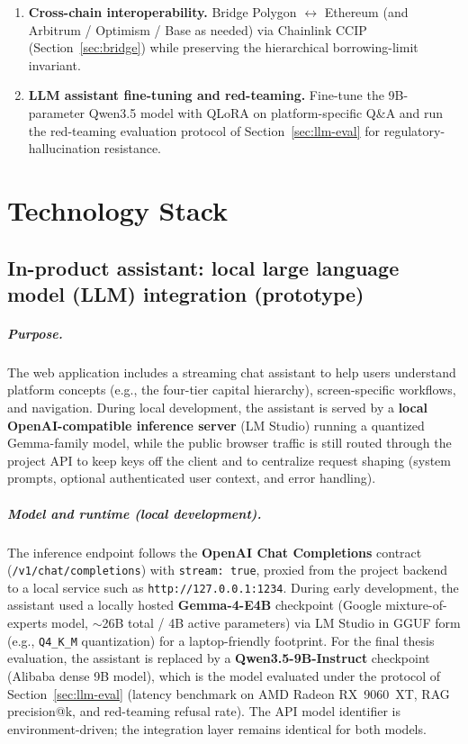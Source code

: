 \documentclass[12pt,a4paper]{report}
\begin{document}
\begin{enumerate}[noitemsep]
\item \textbf{Cross-chain interoperability.} Bridge Polygon $\leftrightarrow$ Ethereum (and Arbitrum / Optimism / Base as needed) via Chainlink CCIP (Section~\ref{sec:bridge}) while preserving the hierarchical borrowing-limit invariant.
\item \textbf{LLM assistant fine-tuning and red-teaming.} Fine-tune the 9B-parameter Qwen3.5 model with QLoRA on platform-specific Q\&A and run the red-teaming evaluation protocol of Section~\ref{sec:llm-eval} for regulatory-hallucination resistance.
\end{enumerate}


\appendix

\chapter{Technology Stack}

\section{In-product assistant: local large language model (LLM) integration (prototype)}

\paragraph{Purpose.}
The web application includes a streaming chat assistant to help users understand platform concepts (e.g., the four-tier capital hierarchy), screen-specific workflows, and navigation. During local development, the assistant is served by a \textbf{local OpenAI-compatible inference server} (LM Studio) running a quantized Gemma-family model, while the public browser traffic is still routed through the project API to keep keys off the client and to centralize request shaping (system prompts, optional authenticated user context, and error handling).

\paragraph{Model and runtime (local development).}
The inference endpoint follows the \textbf{OpenAI Chat Completions} contract (\texttt{/v1/chat/completions}) with \texttt{stream: true}, proxied from the project backend to a local service such as \texttt{http://127.0.0.1:1234}. During early development, the assistant used a locally hosted \textbf{Gemma-4-E4B} checkpoint (Google mixture-of-experts model, $\sim$26B total / 4B active parameters) via LM Studio in GGUF form (e.g., \texttt{Q4\_K\_M} quantization) for a laptop-friendly footprint. For the final thesis evaluation, the assistant is replaced by a \textbf{Qwen3.5-9B-Instruct} checkpoint (Alibaba dense 9B model), which is the model evaluated under the protocol of Section~\ref{sec:llm-eval} (latency benchmark on AMD Radeon RX~9060~XT, RAG precision@k, and red-teaming refusal rate). The API model identifier is environment-driven; the integration layer remains identical for both models.
\end{document}
